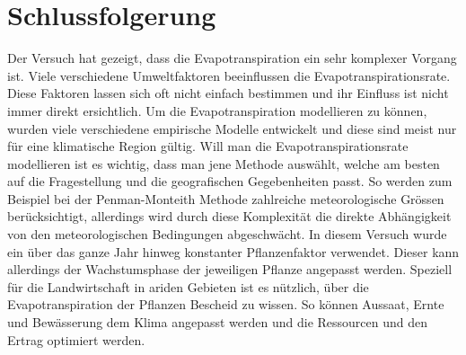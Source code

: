 \section{Schlussfolgerung}

Der Versuch hat gezeigt, dass die Evapotranspiration ein sehr komplexer Vorgang ist. Viele verschiedene Umweltfaktoren beeinflussen die Evapotranspirationsrate. Diese Faktoren lassen sich oft nicht einfach bestimmen und ihr Einfluss ist nicht immer direkt ersichtlich. Um die Evapotranspiration modellieren zu können, wurden viele verschiedene empirische Modelle entwickelt und diese sind meist nur für eine klimatische Region gültig. Will man die Evapotranspirationsrate modellieren ist es wichtig, dass man jene Methode auswählt, welche am besten auf die Fragestellung und die geografischen Gegebenheiten passt. So werden zum Beispiel bei der Penman-Monteith Methode zahlreiche meteorologische Grössen berücksichtigt, allerdings wird durch diese Komplexität die direkte Abhängigkeit von den meteorologischen Bedingungen abgeschwächt.
In diesem Versuch wurde ein über das ganze Jahr hinweg konstanter Pflanzenfaktor verwendet. Dieser kann allerdings der Wachstumsphase der jeweiligen Pflanze angepasst werden. Speziell für die Landwirtschaft in ariden Gebieten ist es nützlich, über die Evapotranspiration der Pflanzen Bescheid zu wissen. So können Aussaat, Ernte und Bewässerung dem Klima angepasst werden und die Ressourcen und den Ertrag optimiert werden. 

